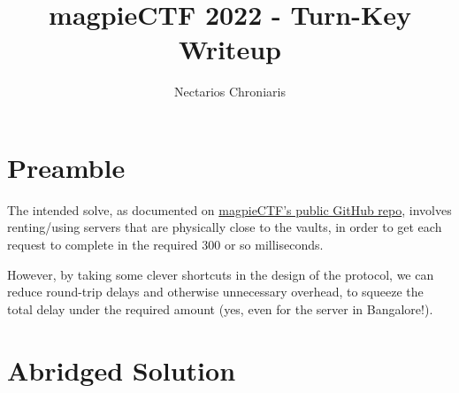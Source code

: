 \documentclass[11pt]{article}
\begin{document}
    \title{magpieCTF 2022 - Turn-Key Writeup}
    \author{Nectarios Chroniaris}

    \maketitle


    \section{Preamble}\label{sec:preamble}

    The intended solve, as documented on \href{https://github.com/infosec-ucalgary/magpieCTF2022-public/tree/main/challenges/networks/turn-key}{magpieCTF's public GitHub repo}, involves renting/using servers that are physically close to the vaults, in order to get each request to complete in the required 300 or so milliseconds.

    \bigskip

    However, by taking some clever shortcuts in the design of the protocol, we can reduce round-trip delays and otherwise unnecessary overhead, to squeeze the total delay under the required amount (yes, even for the server in Bangalore!).


    \section{Abridged Solution}\label{sec:abridged-solution}
\end{document}

